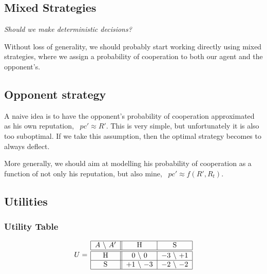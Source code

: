 \documentclass[10pt,fleqn]{article}
\begin{document}
\subsection{Mixed Strategies}
\emph{Should we make deterministic decisions?}

Without loss of generality, we should probably start working directly using
mixed strategies, where we assign a probability of cooperation to both our agent
and the opponent's.


\subsection{Opponent strategy}

A naive idea is to have the opponent's probability of cooperation approximated
as his own reputation, \ie\ $pc' \approx R'$. This is very simple, but
unfortunately it is also too suboptimal. If we take this assumption, then the
optimal strategy becomes to always deflect.

More generally, we should aim at modelling his probability of cooperation as a
function of not only his reputation, but also mine, \ie\ $pc' \approx f(R',
R_t)$.

\subsection{Utilities}

\subsubsection{Utility Table}
\begin{equation*}
  U =\,
    \begin{tabular}{|c||c|c|}
      \hline
      $A$ \textbackslash\ $A'$ & H & S \\
      \hline\hline
      H & $0$ \textbackslash\ $0$ & $-3$ \textbackslash\ $+1$ \\
      \hline
      S & $+1$ \textbackslash\ $-3$ & $-2$ \textbackslash\ $-2$ \\
      \hline
    \end{tabular}
\end{equation*}
\end{document}
